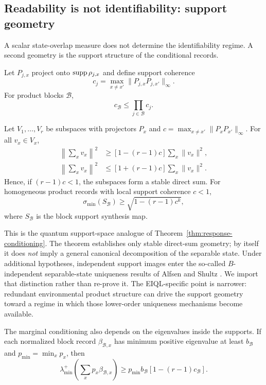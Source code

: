 \subsection{Readability is not identifiability: support geometry}
\label{sec:support}

A scalar state-overlap measure does not determine the identifiability regime.  A second geometry is the support structure of the conditional records.

Let $P_{j,x}$ project onto $\operatorname{supp}\rho_{j,x}$ and define support coherence
\begin{equation}
c_j=\max_{x\neq x'}\|P_{j,x}P_{j,x'}\|_\infty.
\label{eq:support-coherence}
\end{equation}
For product blocks $\mathcal B$,
\begin{equation}
c_{\mathcal B}\le\prod_{j\in\mathcal B}c_j.
\label{eq:support-product}
\end{equation}

\begin{theorem}
\label{thm:support-transverse}
Let $V_1,\ldots,V_r$ be subspaces with projectors $P_x$ and $c=\max_{x\neq x'}\|P_xP_{x'}\|_\infty$.  For all $v_x\in V_x$,
\begin{equation}
\begin{aligned}
\left\|\sum_xv_x\right\|^2
&\ge[1-(r-1)c]\sum_x\|v_x\|^2,\\
\left\|\sum_xv_x\right\|^2
&\le[1+(r-1)c]\sum_x\|v_x\|^2.
\end{aligned}
\label{eq:support-frame}
\end{equation}
Hence, if $(r-1)c<1$, the subspaces form a stable direct sum.  For homogeneous product records with local support coherence $c<1$,
\begin{equation}
\sigma_{\min}(S_{\mathcal B})\ge\sqrt{1-(r-1)c^k},
\end{equation}
where $S_{\mathcal B}$ is the block support synthesis map.
\end{theorem}

This is the quantum support-space analogue of Theorem~\ref{thm:response-conditioning}.  The theorem establishes only stable direct-sum geometry; by itself it does \emph{not} imply a general canonical decomposition of the separable state.  Under additional hypotheses, independent support images enter the so-called $B$-independent separable-state uniqueness results of Alfsen and Shultz \cite{alfsen2012}.  We import that distinction rather than re-prove it.  The EIQL-specific point is narrower: redundant environmental product structure can drive the support geometry toward a regime in which those lower-order uniqueness mechanisms become available.

The marginal conditioning also depends on the eigenvalues inside the supports.  If each normalized block record $\beta_{\mathcal B,x}$ has minimum positive eigenvalue at least $b_{\mathcal B}$ and $p_{\min}=\min_xp_x$, then
\begin{equation}
\lambda_{\min}^+\!\left(\sum_xp_x\beta_{\mathcal B,x}\right)
\ge p_{\min}b_{\mathcal B}[1-(r-1)c_{\mathcal B}].
\label{eq:marginal-conditioning}
\end{equation}
